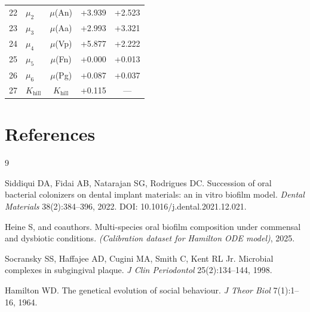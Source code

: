 \documentclass[11pt,a4paper]{article}
\begin{document}
\begin{table}[H]
\begin{tabular}{clccc}
   22 & $\mu_2$ & $\mu$(An)    & +3.939 & +2.523 \\
   23 & $\mu_3$ & $\mu$(Aa)    & +2.993 & +3.321 \\
   24 & $\mu_4$ & $\mu$(Vp)    & +5.877 & +2.222 \\
   25 & $\mu_5$ & $\mu$(Fn)    & +0.000 & +0.013 \\
   26 & $\mu_6$ & $\mu$(Pg)    & +0.087 & +0.037 \\
   27 & $K_\mathrm{hill}$ & $K_\mathrm{hill}$ & +0.115 & --- \\
\bottomrule
\end{tabular}
\end{table}

\section*{References}

\begin{thebibliography}{9}

Siddiqui DA, Fidai AB, Natarajan SG, Rodrigues DC.
Succession of oral bacterial colonizers on dental implant materials:
an in vitro biofilm model.
\textit{Dental Materials} 38(2):384--396, 2022.
DOI: 10.1016/j.dental.2021.12.021.

Heine S, and coauthors.
Multi-species oral biofilm composition under commensal and dysbiotic conditions.
\textit{(Calibration dataset for Hamilton ODE model)}, 2025.

Socransky SS, Haffajee AD, Cugini MA, Smith C, Kent RL Jr.
Microbial complexes in subgingival plaque.
\textit{J Clin Periodontol} 25(2):134--144, 1998.

Hamilton WD.
The genetical evolution of social behaviour.
\textit{J Theor Biol} 7(1):1--16, 1964.

\end{thebibliography}
\end{document}
